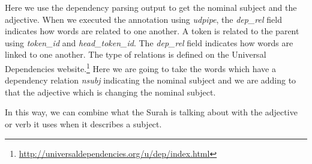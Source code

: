 \documentclass[
]{article}
\newenvironment{Shaded}{\begin{snugshade}}{\end{snugshade}}
\newcommand{\AttributeTok}[1]{\textcolor[rgb]{0.13,0.29,0.53}{#1}}
\newcommand{\ConstantTok}[1]{\textcolor[rgb]{0.56,0.35,0.01}{#1}}
\newcommand{\FunctionTok}[1]{\textcolor[rgb]{0.13,0.29,0.53}{\textbf{#1}}}
\newcommand{\NormalTok}[1]{#1}
\newcommand{\OtherTok}[1]{\textcolor[rgb]{0.56,0.35,0.01}{#1}}
\newcommand{\SpecialCharTok}[1]{\textcolor[rgb]{0.81,0.36,0.00}{\textbf{#1}}}
\newcommand{\StringTok}[1]{\textcolor[rgb]{0.31,0.60,0.02}{#1}}
\begin{document}
Here we use the dependency parsing output to get the nominal subject and the adjective. When we executed the annotation using \emph{udpipe}, the \emph{dep\_rel} field indicates how words are related to one another. A token is related to the parent using \emph{token\_id} and \emph{head\_token\_id}. The \emph{dep\_rel} field indicates how words are linked to one another. The type of relations is defined on the Universal Dependencies website.\footnote{ \url{http://universaldependencies.org/u/dep/index.html}} Here we are going to take the words which have a dependency relation \emph{nsubj} indicating the nominal subject and we are adding to that the adjective which is changing the nominal subject.

In this way, we can combine what the Surah is talking about with the adjective or verb it uses when it describes a subject.

\footnotesize

\begin{Shaded}
\end{Shaded}
\end{document}
